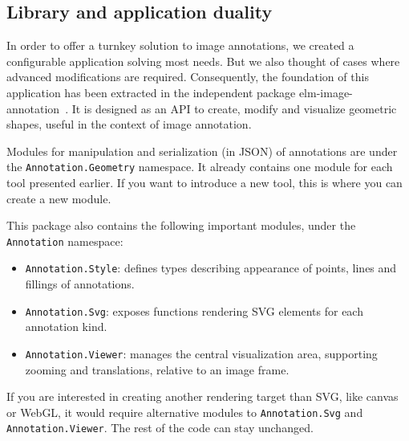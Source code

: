 

% 


\subsection{Library and application duality}

In order to offer a turnkey solution to image annotations,
we created a configurable application solving most needs.
But we also thought of cases where advanced modifications are required.
Consequently, the foundation of this application has been extracted
in the independent package elm-image-annotation~\cite{annotationpackage}.
It is designed as an API to create, modify and visualize geometric shapes,
useful in the context of image annotation.

Modules for manipulation and serialization (in JSON) of annotations are
under the \verb|Annotation.Geometry| namespace.
It already contains one module for each tool presented earlier.
If you want to introduce a new tool, this is where you can create a new module.

This package also contains the following important modules,
under the \verb|Annotation| namespace:
\begin{itemize}
	\item \verb|Annotation.Style|:
		defines types describing appearance of points, lines and fillings of annotations.
	\item \verb|Annotation.Svg|:
		exposes functions rendering SVG elements for each annotation kind.
	\item \verb|Annotation.Viewer|:
		manages the central visualization area,
		supporting zooming and translations, relative to an image frame.
\end{itemize}
If you are interested in creating another rendering target than SVG,
like canvas or WebGL, it would require alternative modules
to \verb|Annotation.Svg| and \verb|Annotation.Viewer|.
The rest of the code can stay unchanged.



